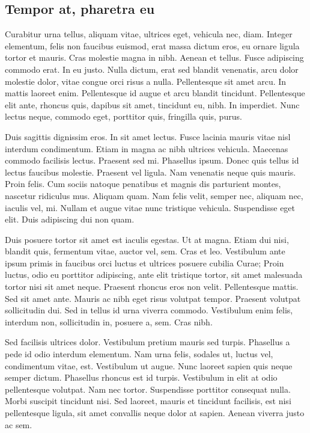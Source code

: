 \documentclass[../hdr.tex]{subfiles}
\begin{document}
\subsection*{Tempor at, pharetra eu}

Curabitur urna tellus, aliquam vitae, ultrices eget, vehicula nec, diam. Integer
elementum, felis non faucibus euismod, erat massa dictum eros, eu ornare ligula
tortor et mauris. Cras molestie magna in nibh. Aenean et tellus. Fusce
adipiscing commodo erat. In eu justo. Nulla dictum, erat sed blandit venenatis,
arcu dolor molestie dolor, vitae congue orci risus a nulla. Pellentesque sit
amet arcu. In mattis laoreet enim. Pellentesque id augue et arcu blandit
tincidunt. Pellentesque elit ante, rhoncus quis, dapibus sit amet, tincidunt eu,
nibh. In imperdiet. Nunc lectus neque, commodo eget, porttitor quis, fringilla
quis, purus.

Duis sagittis dignissim eros. In sit amet lectus. Fusce lacinia mauris vitae
nisl interdum condimentum. Etiam in magna ac nibh ultrices vehicula. Maecenas
commodo facilisis lectus. Praesent sed mi. Phasellus ipsum. Donec quis tellus id
lectus faucibus molestie. Praesent vel ligula. Nam venenatis neque quis mauris.
Proin felis. Cum sociis natoque penatibus et magnis dis parturient montes,
nascetur ridiculus mus. Aliquam quam. Nam felis velit, semper nec, aliquam nec,
iaculis vel, mi. Nullam et augue vitae nunc tristique vehicula. Suspendisse eget
elit. Duis adipiscing dui non quam.

Duis posuere tortor sit amet est iaculis egestas. Ut at magna. Etiam dui nisi,
blandit quis, fermentum vitae, auctor vel, sem. Cras et leo. Vestibulum ante
ipsum primis in faucibus orci luctus et ultrices posuere cubilia Curae; Proin
luctus, odio eu porttitor adipiscing, ante elit tristique tortor, sit amet
malesuada tortor nisi sit amet neque. Praesent rhoncus eros non velit.
Pellentesque mattis. Sed sit amet ante. Mauris ac nibh eget risus volutpat
tempor. Praesent volutpat sollicitudin dui. Sed in tellus id urna viverra
commodo. Vestibulum enim felis, interdum non, sollicitudin in, posuere a, sem.
Cras nibh.

Sed facilisis ultrices dolor. Vestibulum pretium mauris sed turpis. Phasellus a
pede id odio interdum elementum. Nam urna felis, sodales ut, luctus vel,
condimentum vitae, est. Vestibulum ut augue. Nunc laoreet sapien quis neque
semper dictum. Phasellus rhoncus est id turpis. Vestibulum in elit at odio
pellentesque volutpat. Nam nec tortor. Suspendisse porttitor consequat nulla.
Morbi suscipit tincidunt nisi. Sed laoreet, mauris et tincidunt facilisis, est
nisi pellentesque ligula, sit amet convallis neque dolor at sapien. Aenean
viverra justo ac sem.
\end{document}
